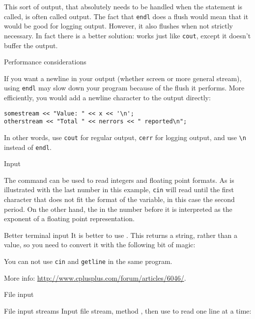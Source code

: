 This sort of output, that absolutely needs to be handled when the
statement is called, is often called  output.
The fact that \lstinline{endl} does a flush would mean that it would be good
for logging output. However, it also flushes when not strictly
necessary. In fact there is a better solution:
 works just like \lstinline{cout}, except it
doesn't buffer the output.

 {Performance considerations}

If you want a newline in your output (whether screen or more general stream),
using \lstinline+endl+ may slow down your program because of the flush
it performs.
More efficiently, you would add a newline character to the output directly:
\begin{lstlisting}
somestream << "Value: " << x << '\n';
otherstream << "Total " << nerrors << " reported\n";
\end{lstlisting}
In other words, use \lstinline{cout} for regular output, \lstinline{cerr} for logging
output, and use \verb+\n+ instead of \lstinline{endl}.

 {Input}
\label{sec:termin}

The  command can be used to read integers
and floating point formats.
%
%
As is illustrated with the last number in this example,
\lstinline{cin} will read until the first character that does not
fit the format of the variable, in this case the second period.
On the other hand, the  in the number before it is 
interpreted as the exponent of a floating point representation.

\begin{block}{Better terminal input}
  \label{sl:getline}
  It is better to use . This returns a string,
  rather than a value, so you need to convert it with the following bit
  of magic:

  You can not use \lstinline{cin} and \lstinline{getline} in the same program.

  More info:
  \url{http://www.cplusplus.com/forum/articles/6046/}.

\end{block}

 {File input}

\begin{block}{File input streams}
  \label{sl:filein}
  Input file stream, method , then use
   to read one line at a time:
\end{block}


